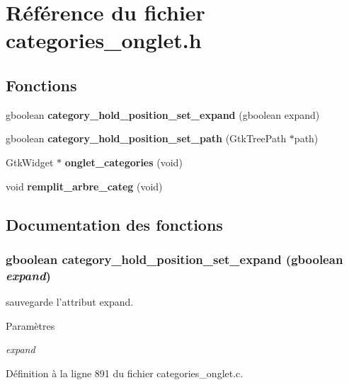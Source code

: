 \section{Référence du fichier categories\_\-onglet.h}
\label{categories__onglet_8h}
\subsection*{Fonctions}
\begin{DoxyCompactItemize}
\item 
gboolean {\bf category\_\-hold\_\-position\_\-set\_\-expand} (gboolean expand)
\item 
gboolean {\bf category\_\-hold\_\-position\_\-set\_\-path} (GtkTreePath $\ast$path)
\item 
GtkWidget $\ast$ {\bf onglet\_\-categories} (void)
\item 
void {\bf remplit\_\-arbre\_\-categ} (void)
\end{DoxyCompactItemize}


\subsection{Documentation des fonctions}
\subsubsection[{category\_\-hold\_\-position\_\-set\_\-expand}]{\setlength{\rightskip}{0pt plus 5cm}gboolean category\_\-hold\_\-position\_\-set\_\-expand (gboolean {\em expand})}\label{categories__onglet_8h_a5b685ac483cc1dcc8dc736a644a80651}
sauvegarde l'attribut expand.


\begin{DoxyParams}{Paramètres}
\item[{\em expand}]\end{DoxyParams}


Définition à la ligne 891 du fichier categories\_\-onglet.c.

